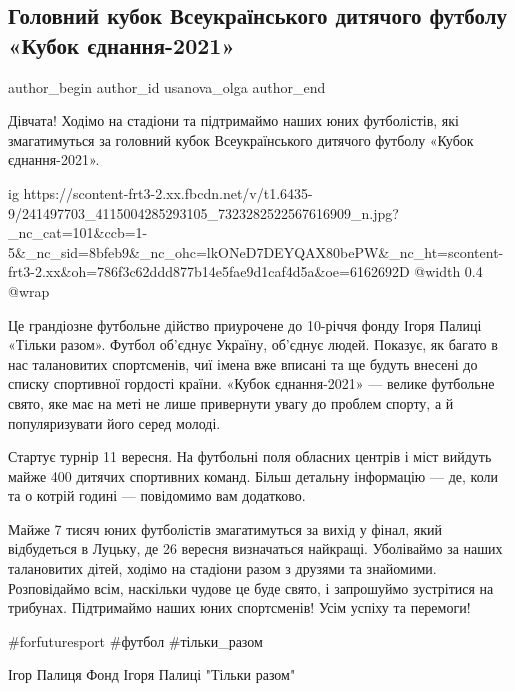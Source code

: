  
 
 
 
 
 
\subsection{Головний кубок Всеукраїнського дитячого футболу «Кубок єднання-2021»}
\label{sec:03_09_2021.fb.usanova_olga.1.kubok_futbol_deti}
 
\ifcmt
 author_begin
   author_id usanova_olga
 author_end
\fi

Дівчата! Ходімо на стадіони та підтримаймо наших юних футболістів, які
змагатимуться за головний кубок Всеукраїнського дитячого футболу «Кубок
єднання-2021». 

\ifcmt
  ig https://scontent-frt3-2.xx.fbcdn.net/v/t1.6435-9/241497703_4115004285293105_7323282522567616909_n.jpg?_nc_cat=101&ccb=1-5&_nc_sid=8bfeb9&_nc_ohc=lkONeD7DEYQAX80bePW&_nc_ht=scontent-frt3-2.xx&oh=786f3c62ddd877b14e5fae9d1caf4d5a&oe=6162692D
  @width 0.4
  @wrap 
\fi

Це грандіозне футбольне дійство приурочене до 10-річчя фонду Ігоря Палиці
«Тільки разом». Футбол об’єднує Україну, об’єднує людей. Показує, як багато в
нас талановитих спортсменів, чиї імена вже вписані та ще будуть внесені до
списку спортивної гордості країни. «Кубок єднання-2021» — велике футбольне
свято, яке має на меті не лише привернути увагу до проблем спорту, а й
популяризувати його серед молоді.

Стартує турнір 11 вересня. На футбольні поля обласних центрів і міст вийдуть
майже 400 дитячих спортивних команд. Більш детальну інформацію — де, коли та о
котрій годині — повідомимо вам додатково. 

Майже 7 тисяч юних футболістів змагатимуться за вихід у фінал, який відбудеться
в Луцьку, де 26 вересня визначаться найкращі. Уболіваймо за наших талановитих
дітей, ходімо на стадіони разом з друзями та знайомими. Розповідаймо всім,
наскільки чудове це буде свято, і запрошуймо зустрітися на трибунах.
Підтримаймо наших юних спортсменів! Усім успіху та перемоги!

\#forfuturesport \#футбол \#тільки\_разом

Ігор Палиця Фонд Ігоря Палиці "Тільки разом"

